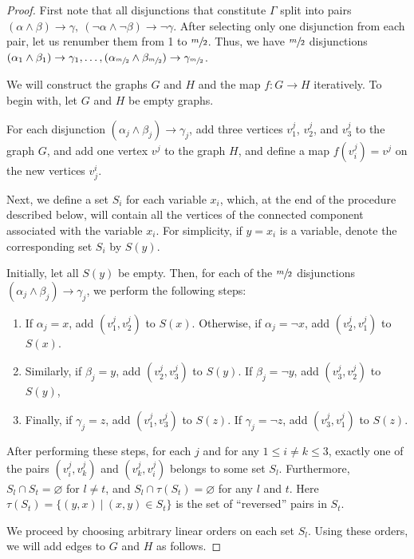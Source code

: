 \documentclass[a4paper,12pt,reqno,oneside]{amsart}
\theoremstyle{plain}
\theoremstyle{definition}
\theoremstyle{plain}
\newcommand{\from}{\colon}
\begin{document}
\begin{proof}
  First note that all disjunctions that constitute $\Gamma$ split into pairs
  $(\alpha \land \beta) \to \gamma,\ (\neg \alpha \land \neg \beta) \to \neg \gamma$. After
  selecting only one disjunction from each pair, let us renumber them from 1 to $\sfrac{m}2$. Thus,
  we have $\sfrac{m}2$ disjunctions
  $(\alpha_1 \land \beta_1) \to \gamma_1, \dots, (\alpha_{\sfrac{m}2} \land \beta_{\sfrac{m}2}) \to
  \gamma_{\sfrac{m}2}$.

  We will construct the graphs $G$ and $H$ and the map $f \from G \to H$ iteratively. To begin with,
  let $G$ and $H$ be empty graphs.

  For each disjunction $(\alpha_j \land \beta_j) \to \gamma_j$, add three vertices $v^j_1$, $v^j_2$, and
  $v^j_3$ to the graph $G$, and add one vertex $v^j$ to the graph $H$, and define a map
  $f(v^j_i) = v^j$ on the new vertices $v_j^i$.

  Next, we define a set $S_i$ for each variable $x_i$, which, at the end of the procedure described
  below, will contain all the vertices of the connected component associated with the variable
  $x_i$.  For simplicity, if $y = x_i$ is a variable, denote the corresponding set $S_i$ by
  $S(y)$.

  Initially, let all $S(y)$ be empty. Then, for each of the $\sfrac{m}2$ disjunctions
  $(\alpha_j \wedge \beta_j) \to \gamma_j$, we perform the following steps:
  \begin{enumerate}
  \item If $\alpha_j = x$, add $(v^j_1, v^j_2)$ to $S(x)$. Otherwise, if $\alpha_j = \neg x$, add $(v^j_2, v^j_1)$ to $S(x)$.
  \item Similarly, if $\beta_j = y$, add $(v^j_2, v^j_3)$ to $S(y)$. If $\beta_j = \neg y$, add $(v^j_3, v^j_2)$ to $S(y)$,
  \item Finally, if $\gamma_j = z$, add $(v^j_1, v^j_3)$ to $S(z)$. If $\gamma_j = \neg z$, add $(v^j_3, v^j_1)$ to $S(z)$.
  \end{enumerate}

  After performing these steps, for each $j$ and for any $1 \leq i \neq k \leq 3$, exactly one of
  the pairs $(v^j_i, v^j_k)$ and $(v^j_k, v^j_i)$ belongs to some set $S_l$. Furthermore,
  $S_l \cap S_t = \varnothing$ for $l \neq t$, and $S_l \cap \tau(S_t) = \varnothing$ for any $l$
  and $t$. Here $\tau(S_t) = \{ (y, x)\ |\ (x, y) \in S_t \}$ is the set of ``reversed'' pairs in
  $S_t$.

  We proceed by choosing arbitrary linear orders on each set $S_l$. Using these orders, we will add edges to $G$
  and $H$ as follows.


\end{proof}
\end{document}
